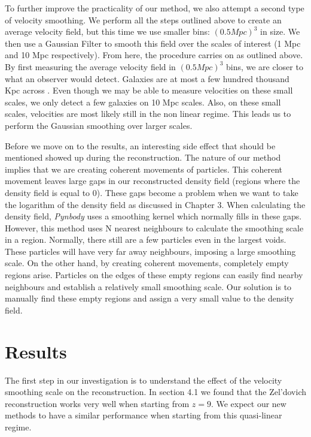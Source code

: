 To further improve the practicality of our method, we also attempt a second type of velocity smoothing. We perform all the steps outlined above to create an average velocity field, but this time we use smaller bins: $(0.5 Mpc)^3$ in size. We then use a Gaussian Filter to smooth this field over the scales of interest (1 Mpc and 10 Mpc respectively). From here, the procedure carries on as outlined above. By first measuring the average velocity field in $(0.5 Mpc)^3$ bins, we are closer to what an observer would detect. Galaxies are at most a few hundred thousand Kpc across . Even though we may be able to measure velocities on these small scales, we only detect a few galaxies on 10 Mpc scales. Also, on these small scales, velocities are most likely still in the non linear regime. This leads us to perform the Gaussian smoothing over larger scales.

Before we move on to the results, an interesting side effect that should be mentioned showed up during the reconstruction. The nature of our method implies that we are creating coherent movements of particles. This coherent movement leaves large gaps in our reconstructed density field (regions where the density field is equal to 0). These gaps become a problem when we want to take the logarithm of the density field as discussed in Chapter 3. When calculating the density field, \textit{Pynbody} uses a smoothing kernel which normally fills in these gaps. However, this method uses N nearest neighbours to calculate the smoothing scale in a region. Normally, there still are a few particles even in the largest voids. These particles will have very far away neighbours, imposing a large smoothing scale. On the other hand, by creating coherent movements, completely empty regions arise. Particles on the edges of these empty regions can easily find nearby neighbours and establish a relatively small smoothing scale. Our solution is to manually find these empty regions and assign a very small value to the density field. 

\section{Results}

The first step in our investigation is to understand the effect of the velocity smoothing scale on the reconstruction. In section 4.1 we found that the Zel'dovich reconstruction works very well when starting from $z=9$. We expect our new methods to have a similar performance when starting from this quasi-linear regime. 


